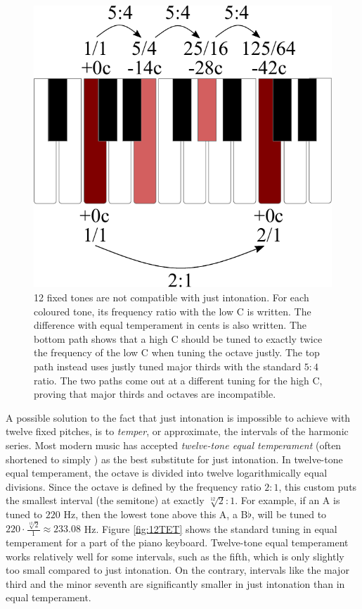 \documentclass[a4paper]{article}
\begin{document}
\begin{figure}
	\centering
	\includegraphics[height=0.35\textheight]{Figures/ThirdsProof.pdf}%
	\caption{12 fixed tones are not compatible with just intonation. For each coloured tone, its frequency ratio with the low C is written. The difference with equal temperament in cents is also written. The bottom path shows that a high C should be tuned to exactly twice the frequency of the low C when tuning the octave justly. The top path instead uses justly tuned major thirds with the standard $5:4$ ratio. The two paths come out at a different tuning for the high C, proving that major thirds and octaves are incompatible.}
	\label{fig:thirdsproof}
\end{figure}

A possible solution to the fact that just intonation is impossible to achieve with twelve fixed pitches, is to \textit{temper}, or approximate, the intervals of the harmonic series. Most modern music has accepted \textit{twelve-tone equal temperament} (often shortened to simply ) as the best substitute for just intonation. In twelve-tone equal temperament, the octave is divided into twelve logarithmically equal divisions. Since the octave is defined by the frequency ratio $2:1$, this custom puts the smallest interval (the semitone) at exactly $\sqrt[12]{2}:1$. \cite{van_de_craats_fis_1989} For example, if an A is tuned to $220$ Hz, then the lowest tone above this A, a B$\flat$, will be tuned to $220\cdot \frac{\sqrt[12]{2}}{1} \approx 233.08$ Hz. Figure \ref{fig:12TET} shows the standard tuning in equal temperament for a part of the piano keyboard. Twelve-tone equal temperament works relatively well for some intervals, such as the fifth, which is only slightly too small compared to just intonation. On the contrary, intervals like the major third and the minor seventh are significantly smaller in just intonation than in equal temperament.
\end{document}
